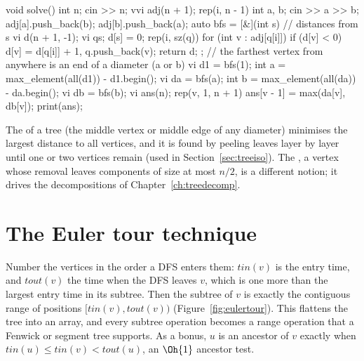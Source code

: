 \begin{code}
void solve() {
    int n;
    cin >> n;
    vvi adj(n + 1);
    rep(i, n - 1) {
        int a, b;
        cin >> a >> b;
        adj[a].push_back(b);
        adj[b].push_back(a);
    }
    auto bfs = [&](int s) {  // distances from s
        vi d(n + 1, -1);
        vi q{s};
        d[s] = 0;
        rep(i, sz(q)) for (int v : adj[q[i]])
            if (d[v] < 0) d[v] = d[q[i]] + 1, q.push_back(v);
        return d;
    };
    // the farthest vertex from anywhere is an end of a diameter (a or b)
    vi d1 = bfs(1);
    int a = max_element(all(d1)) - d1.begin();
    vi da = bfs(a);
    int b = max_element(all(da)) - da.begin();
    vi db = bfs(b);
    vi ans(n);
    rep(v, 1, n + 1) ans[v - 1] = max(da[v], db[v]);
    print(ans);
}
\end{code}


The  of a tree (the middle vertex or middle edge of any diameter) minimises the largest distance to all vertices, and
it is found by peeling leaves layer by layer until one or two vertices remain (used in Section~\ref{sec:treeiso}). The
, a vertex whose removal leaves components of size at most $n/2$, is a different notion; it drives the
decompositions of Chapter~\ref{ch:treedecomp}.

\section[The Euler tour technique]{The Euler tour technique \hfill \gold}\label{sec:eulertour}

Number the vertices in the order a DFS enters them: $\mathit{tin}(v)$ is the entry time, and $\mathit{tout}(v)$ the time when the
DFS leaves $v$, which is one more than the largest entry time in its subtree. Then the subtree of $v$ is exactly the contiguous
range of positions $[\mathit{tin}(v), \mathit{tout}(v))$ (Figure~\ref{fig:eulertour}). This  flattens the
tree into an array, and every subtree operation becomes a range operation that a Fenwick or segment tree supports. As a bonus, $u$
is an ancestor of $v$ exactly when $\mathit{tin}(u) \le \mathit{tin}(v) < \mathit{tout}(u)$, an $\Oh{1}$ ancestor test.

